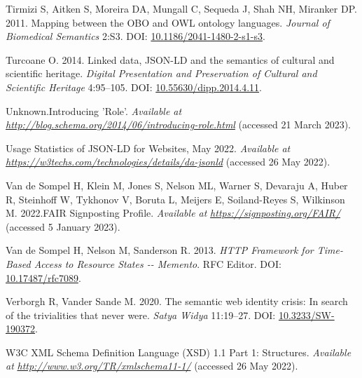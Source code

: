 \begin{CSLReferences}{1}{0}
\leavevmode{}%
Tirmizi S, Aitken S, Moreira DA, Mungall C, Sequeda J, Shah NH, Miranker DP. 2011. Mapping between the OBO and OWL ontology languages. \emph{Journal of Biomedical Semantics} 2:S3. DOI: \href{https://doi.org/10.1186/2041-1480-2-s1-s3}{10.1186/2041-1480-2-s1-s3}.

\leavevmode{}%
Turcoane O. 2014. Linked data, JSON-LD and the semantics of cultural and scientific heritage. \emph{Digital Presentation and Preservation of Cultural and Scientific Heritage} 4:95--105. DOI: \href{https://doi.org/10.55630/dipp.2014.4.11}{10.55630/dipp.2014.4.11}.

\leavevmode{}%
Unknown.Introducing 'Role'. \emph{Available at} \href{http://blog.schema.org/2014/06/introducing-role.html}{\emph{http://blog.schema.org/2014/06/introducing-role.html}} (accessed 21 March 2023).

\leavevmode{}%
Usage Statistics of JSON-LD for Websites, May 2022. \emph{Available at} \href{https://w3techs.com/technologies/details/da-jsonld}{\emph{https://w3techs.com/technologies/details/da-jsonld}} (accessed 26 May 2022).

\leavevmode{}%
Van de Sompel H, Klein M, Jones S, Nelson ML, Warner S, Devaraju A, Huber R, Steinhoff W, Tykhonov V, Boruta L, Meijers E, Soiland-Reyes S, Wilkinson M. 2022.FAIR Signposting Profile. \emph{Available at} \href{https://signposting.org/FAIR/}{\emph{https://signposting.org/FAIR/}} (accessed 5 January 2023).

\leavevmode{}%
Van de Sompel H, Nelson M, Sanderson R. 2013. \emph{HTTP Framework for Time-Based Access to Resource States -\/- Memento}. RFC Editor. DOI: \href{https://doi.org/10.17487/rfc7089}{10.17487/rfc7089}.

\leavevmode{}%
Verborgh R, Vander Sande M. 2020. The semantic web identity crisis: In search of the trivialities that never were. \emph{Satya Widya} 11:19--27. DOI: \href{https://doi.org/10.3233/SW-190372}{10.3233/SW-190372}.

\leavevmode{}%
W3C XML Schema Definition Language (XSD) 1.1 Part 1: Structures. \emph{Available at} \href{http://www.w3.org/TR/xmlschema11-1/}{\emph{http://www.w3.org/TR/xmlschema11-1/}} (accessed 26 May 2022).


\end{CSLReferences}
